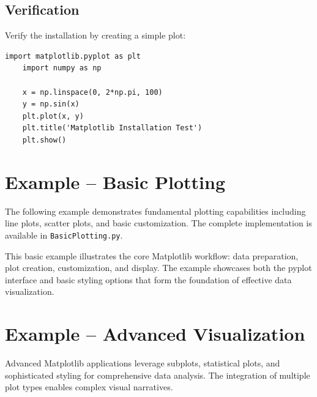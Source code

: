 \subsection{Verification}
\label{subsec:matplotlib_verification}

Verify the installation by creating a simple plot:

\begin{lstlisting}[language=MyPython, caption={Installation Verification}, label={lst:verification}]
	import matplotlib.pyplot as plt
	import numpy as np
	
	x = np.linspace(0, 2*np.pi, 100)
	y = np.sin(x)
	plt.plot(x, y)
	plt.title('Matplotlib Installation Test')
	plt.show()
\end{lstlisting}

\section{Example -- Basic Plotting}
\label{sec:matplotlib_basic_example}

The following example demonstrates fundamental plotting capabilities including line plots, scatter plots, and basic customization. The complete implementation is available in \texttt{BasicPlotting.py}.



This basic example illustrates the core Matplotlib workflow: data preparation, plot creation, customization, and display. The example showcases both the pyplot interface and basic styling options that form the foundation of effective data visualization.

\section{Example -- Advanced Visualization}
\label{sec:advanced_example}

Advanced Matplotlib applications leverage subplots, statistical plots, and sophisticated styling for comprehensive data analysis. The integration of multiple plot types enables complex visual narratives.

\clearpage

